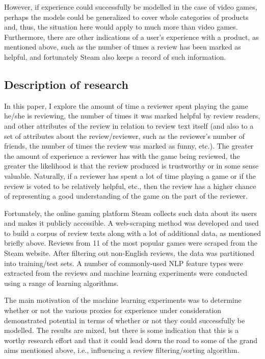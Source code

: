\documentclass[9pt]{article}
\begin{document}
However, if experience could successfully be modelled in the case of video games, perhaps the models could be generalized to cover whole categories of products and, thus, the situation here would apply to much more than video games. Furthermore, there are other indications of a user's experience with a product, as mentioned above, such as the number of times a review has been marked as helpful, and fortunately Steam also keeps a record of such information.

\subsection{Description of research}
\label{ssec:description}

In this paper, I explore the amount of time a reviewer spent playing the game he/she is reviewing, the number of times it was marked helpful by review readers, and other attributes of the review in relation to review text itself (and also to a set of attributes about the review/reviewer, such as the reviewer's number of friends, the number of times the review was marked as funny, etc.). The greater the amount of experience a reviewer has with the game being reviewed, the greater the likelihood is that the review produced is trustworthy or in some sense valuable. Naturally, if a reviewer has spent a lot of time playing a game or if the review is voted to be relatively helpful, etc., then the review has a higher chance of representing a good understanding of the game on the part of the reviewer.

Fortunately, the online gaming platform Steam collects such data about its users and makes it publicly accessible. A web-scraping method was developed and used to build a corpus of review texts along with a lot of additional data, as mentioned briefly above. Reviews from 11 of the most popular games were scraped from the Steam website. After filtering out non-English reviews, the data was partitioned into training/test sets. A number of commonly-used NLP feature types were extracted from the reviews and machine learning experiments were conducted using a range of learning algorithms.

The main motivation of the machine learning experiments was to determine whether or not the various proxies for experience under consideration demonstrated potential in terms of whether or not they could successfully be modelled. The results are mixed, but there is some indication that this is a worthy research effort and that it could lead down the road to some of the grand aims mentioned above, i.e., influencing a review filtering/sorting algorithm.
\end{document}
